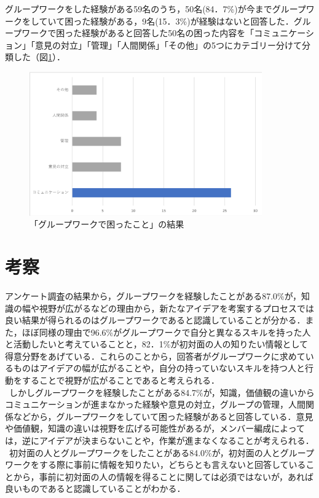 \documentclass{funthesis}
\begin{document}
グループワークをした経験がある59名のうち，50名(84．7\%)が今までグループワークをしていて困った経験がある，9名(15．3\%)が経験はないと回答した．グループワークで困った経験があると回答した50名の困った内容を「コミュニケーション」「意見の対立」「管理」「人間関係」「その他」の5つにカテゴリー分けて分類した（図\ref{graph4}）．

\begin{figure}[H]
 \centering
   \includegraphics[width=100mm]{figures/finalchart4.png}
 \caption{「グループワークで困ったこと」の結果}
 \label{graph4}
\end{figure}


\section{考察}

アンケート調査の結果から，グループワークを経験したことがある87.0\%が，知識の幅や視野が広がるなどの理由から，新たなアイデアを考案するプロセスでは良い結果が得られるのはグループワークであると認識していることが分かる．また，ほぼ同様の理由で96.6\%がグループワークで自分と異なるスキルを持った人と活動したいと考えていることと，82．1\%が初対面の人の知りたい情報として得意分野をあげている．これらのことから，回答者がグループワークに求めているものはアイデアの幅が広がることや，自分の持っていないスキルを持つ人と行動をすることで視野が広がることであると考えられる．\\
\ しかしグループワークを経験したことがある84.7\%が，知識，価値観の違いからコミュニケーションが進まなかった経験や意見の対立，グループの管理，人間関係などから，グループワークをしていて困った経験があると回答している．意見や価値観，知識の違いは視野を広げる可能性があるが，メンバー編成によっては，逆にアイデアが決まらないことや，作業が進まなくなることが考えられる．
\ 初対面の人とグループワークをしたことがある84.0\%が，初対面の人とグループワークをする際に事前に情報を知りたい，どちらとも言えないと回答していることから，事前に初対面の人の情報を得ることに関しては必須ではないが，あれば良いものであると認識していることがわかる．\\
\end{document}
